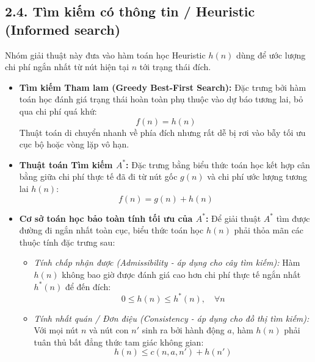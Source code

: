 \documentclass[11pt,a4paper]{article}
\begin{document}
\subsection{2.4. Tìm kiếm có thông tin / Heuristic (Informed search)}
Nhóm giải thuật này đưa vào hàm toán học Heuristic $h(n)$ dùng để ước lượng chi phí ngắn nhất từ nút hiện tại $n$ tới trạng thái đích.
\begin{itemize}
    \item \textbf{Tìm kiếm Tham lam (Greedy Best-First Search):} Đặc trưng bởi hàm toán học đánh giá trạng thái hoàn toàn phụ thuộc vào dự báo tương lai, bỏ qua chi phí quá khứ:
    \begin{equation}
        f(n) = h(n)
    \end{equation}
    Thuật toán di chuyển nhanh về phía đích nhưng rất dễ bị rơi vào bẫy tối ưu cục bộ hoặc vòng lặp vô hạn.
    \item \textbf{Thuật toán Tìm kiếm $A^*$:} Đặc trưng bằng biểu thức toán học kết hợp cân bằng giữa chi phí thực tế đã đi từ nút gốc $g(n)$ và chi phí ước lượng tương lai $h(n)$:
    \begin{equation}
        f(n) = g(n) + h(n)
    \end{equation}
    \item \textbf{Cơ sở toán học bảo toàn tính tối ưu của $A^*$:} Để giải thuật $A^*$ tìm được đường đi ngắn nhất toàn cục, biểu thức toán học $h(n)$ phải thỏa mãn các thuộc tính đặc trưng sau:
    \begin{itemize}
        \item \textit{Tính chấp nhận được (Admissibility - áp dụng cho cây tìm kiếm):} Hàm $h(n)$ không bao giờ được đánh giá cao hơn chi phí thực tế ngắn nhất $h^*(n)$ để đến đích:
        \begin{equation}
            0 \le h(n) \le h^*(n), \quad \forall n
        \end{equation}
        \item \textit{Tính nhất quán / Đơn điệu (Consistency - áp dụng cho đồ thị tìm kiếm):} Với mọi nút $n$ và nút con $n'$ sinh ra bởi hành động $a$, hàm $h(n)$ phải tuân thủ bất đẳng thức tam giác không gian:
        \begin{equation}
            h(n) \le c(n, a, n') + h(n')
        \end{equation}
    \end{itemize}
\end{itemize}
\end{document}
